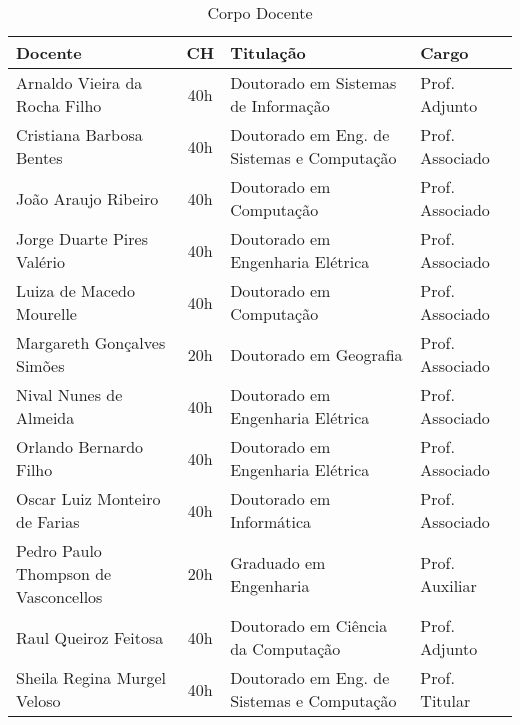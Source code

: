 \begin{table}
\centering
\caption{Corpo Docente}
\label{CorpoDocente}
\begin{tabular}{|l|c|l|l|}
\hline
{\textbf{Docente}} & \textbf{CH} & \textbf{Titulação} &\textbf{Cargo} \\
\hline
Arnaldo Vieira da Rocha Filho & 40h & Doutorado em Sistemas de Informação & Prof. Adjunto \\
Cristiana Barbosa Bentes & 40h & Doutorado em Eng. de Sistemas e Computação & Prof. Associado \\
João Araujo Ribeiro & 40h & Doutorado em Computação & Prof. Associado \\
Jorge Duarte Pires Valério & 40h & Doutorado em Engenharia Elétrica & Prof. Associado \\
Luiza de Macedo Mourelle & 40h & Doutorado em Computação & Prof. Associado \\
Margareth Gonçalves Simões & 20h & Doutorado em Geografia & Prof. Associado \\
Nival Nunes de Almeida & 40h & Doutorado em Engenharia Elétrica & Prof. Associado \\
Orlando Bernardo Filho & 40h & Doutorado em Engenharia Elétrica & Prof. Associado \\
Oscar Luiz Monteiro de Farias & 40h & Doutorado em Informática & Prof. Associado \\
Pedro Paulo Thompson de Vasconcellos & 20h & Graduado em Engenharia & Prof. Auxiliar \\
Raul Queiroz Feitosa & 40h & Doutorado em Ciência da Computação & Prof. Adjunto \\
Sheila Regina Murgel Veloso & 40h & Doutorado em Eng. de Sistemas e Computação & Prof. Titular \\
\hline
\end{tabular}
\end{table}






